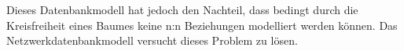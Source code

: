 Dieses Datenbankmodell hat jedoch den Nachteil, dass bedingt durch die Kreisfreiheit eines Baumes keine n:n Beziehungen modelliert werden können.
Das Netzwerkdatenbankmodell versucht dieses Problem zu lösen.
%
